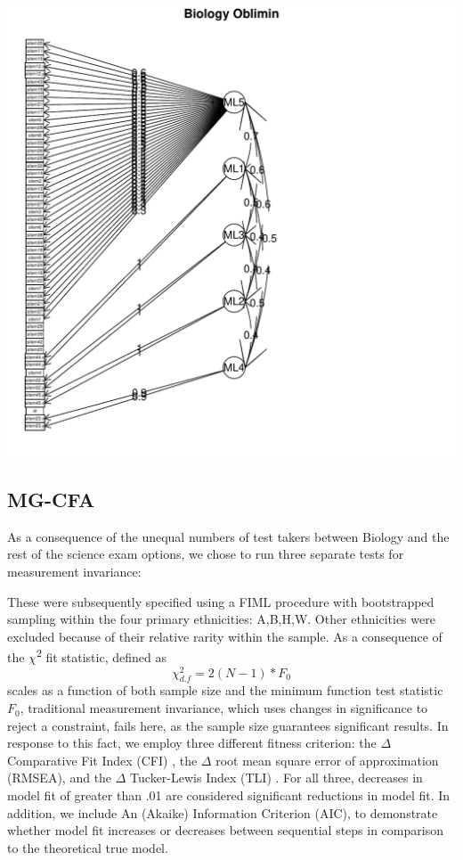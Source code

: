 \documentclass{article}\usepackage[]{graphicx}\usepackage[]{color}
\makeatletter
\def\maxwidth{ %
  \ifdim\Gin@nat@width>\linewidth
    \linewidth
  \else
    \Gin@nat@width
  \fi
}
\newenvironment{knitrout}{}{} %
\makeatother
\begin{document}
\begin{knitrout}
\includegraphics[width=\maxwidth]{figure/unnamed-chunk-13} 

\end{knitrout}

\subsection{MG-CFA}
As a consequence of the unequal numbers of test takers between Biology and the rest of the science exam options, we chose to run three separate tests for measurement invariance: 

  These were subsequently specified using a FIML procedure with bootstrapped sampling within the four primary ethnicities: A,B,H,W. Other ethnicities were excluded because of their relative rarity within the sample. As a consequence of the $\chi$\textsuperscript{2} fit statistic, defined as \begin{equation} \chi^2_{d.f}=2(N-1) * F_0 \end{equation} scales as a function of both sample size and the minimum function test statistic $F_0$, traditional measurement invariance, which uses changes in significance to reject a constraint, fails here, as the sample size guarantees significant results. In response to this fact, we employ three different fitness criterion: the $\Delta$ Comparative Fit Index (CFI) \cite{Bentler}, the $\Delta$ root mean square error of approximation (RMSEA), and the $\Delta$ Tucker-Lewis Index (TLI) \cite{Chen}. For all three, decreases in model fit of greater than .01 are considered significant reductions in model fit. In addition, we include An (Akaike) Information Criterion (AIC), to demonstrate whether model fit increases or decreases between sequential steps in comparison to the theoretical true model.
\end{document}
